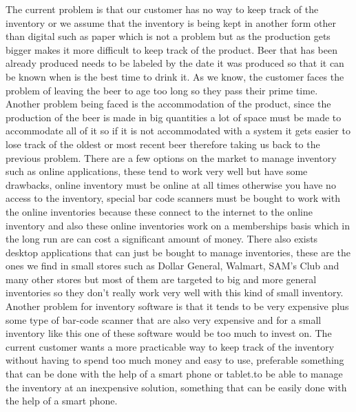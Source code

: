 The current problem is that our customer has no way to keep track of the inventory or we assume that the inventory is being kept in another form other than digital such as paper which is not a problem but as the production gets bigger makes it more difficult to keep track of the product. Beer that has been already produced needs to be labeled by the date it was produced so that it can be known when is the best time to drink it. As we know, the customer faces the problem of leaving the beer to age too long so they pass their prime time. Another problem being faced is the accommodation of the product, since the production of the beer is made in big quantities a lot of space must be made to accommodate all of it so if it is not accommodated with a system it gets easier to lose track of the oldest or most recent beer therefore taking us back to the previous problem. There are a few options on the market to manage inventory such as online applications, these tend to work very well but have some drawbacks, online inventory must be online at all times otherwise you have no access to the inventory, special bar code scanners must be bought to work with the online inventories because these connect to the internet to the online inventory and also these online inventories work on a memberships basis which in the long run are can cost a significant amount of money. There also exists desktop applications that can just be bought to manage inventories, these are the ones we find in small stores such as Dollar General, Walmart, SAM's Club and many other stores but most of them are targeted to big and more general inventories so they don't really work very well with this kind of small inventory. Another problem for inventory software is that it tends to be very expensive plus some type of bar-code scanner that are also very expensive and for a small inventory like this one of these software would be too much to invest on. The current customer wants a more practicable way to keep track of the inventory without having to spend too much money and easy to use, preferable something that can be done with the help of a smart phone or tablet.to be able to manage the inventory at an inexpensive solution, something that can be easily done with the help of a smart phone.
